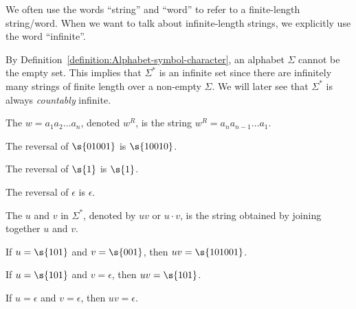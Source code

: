\begin{note} \label{note:Finite-vs-infinite-strings}
We often use the words ``string'' and ``word'' to refer to a finite-length string/word. 
When we want to talk about infinite-length strings, we explicitly use the word ``infinite''.
\end{note}
\begin{note} \label{note:Size-of-Sigma}
By Definition~\ref{definition:Alphabet-symbol-character}, an alphabet $\Sigma$ cannot be the empty set. 
This implies that $\Sigma^*$ is an infinite set since there are infinitely many strings of finite length over a non-empty $\Sigma$. We will later see that $\Sigma^*$ is always \emph{countably} infinite.
\end{note}
\begin{flex}
\begin{definition} \label{definition:Reversal-of-a-string}
The  $w = a_1a_2\ldots a_n$, denoted $w^R$, is the string $w^R = a_na_{n-1}\ldots a_1$.
\end{definition}
\begin{example}[Reversal of $01001$] \label{example:Reversal-of-01001}
The reversal of $\s{01001}$ is $\s{10010}$.
\end{example}
\begin{example}[Reversal of $1$] \label{example:Reversal-of-1}
The reversal of $\s{1}$ is $\s{1}$.
\end{example}
\begin{example} \label{example:Reversal-of-epsilon}
The reversal of $\epsilon$ is $\epsilon$.
\end{example}
\end{flex}
\begin{flex}
\begin{definition} \label{definition:Concatenation-of-strings}
The  $u$ and $v$ in $\Sigma^*$, denoted by $uv$ or $u \cdot v$, is the string obtained by joining together $u$ and $v$. 
\end{definition}
\begin{example} \label{example:Concatenation-of-101-and-001}
If $u = \s{101}$ and $v = \s{001}$, then $uv = \s{101001}$.
\end{example}
\begin{example} \label{example:Concatenation-of-101-and-epsilon}
If $u = \s{101}$ and $v = \epsilon$, then $uv = \s{101}$.
\end{example}
\begin{example} \label{example:Concatenation-of-epsilon-and-epsilon}
If $u = \epsilon$ and $v = \epsilon$, then $uv = \epsilon$.
\end{example}
\end{flex}

